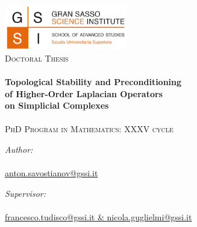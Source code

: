 \documentclass[11pt, a4paper, oneside]{Thesis} %
\begin{document}
\begin{titlepage}
\begin{center}

\includegraphics[width=0.4\textwidth]{./figures/logo_GSSI}~\\[1cm]
\textsc{\Large Doctoral Thesis}\\[0.5cm] %

\HRule \\[0.1cm] %
{\LARGE \bfseries Topological Stability and Preconditioning  
\\[0.3cm] of Higher-Order Laplacian Operators 
\\[0.3cm]
on Simplicial Complexes }\\[0.3cm] %
\HRule \\[0.9cm] %

{\Large \textsc{PhD Program in Mathematics: XXXV cycle}}\\[2cm]

\begin{minipage}{0.4\textwidth}
\begin{flushleft} \large
\emph{Author:}\\
\bigskip \authornames \\
\href{mailto:anton.savostianov@gssi.it}{anton.savostianov@gssi.it}
\end{flushleft}
\end{minipage}
\begin{minipage}{0.5\textwidth}
\begin{flushright} \large
\emph{Supervisor:} \\
\bigskip \supname \\
\href{mailto:francesco.tudisco@gssi.it}{francesco.tudisco@gssi.it \& nicola.guglielmi@gssi.it} \\
\bigskip \bigskip
\end{flushright}
\end{minipage}\\[2.2cm]
 

\end{center}
\end{titlepage}
\end{document}
